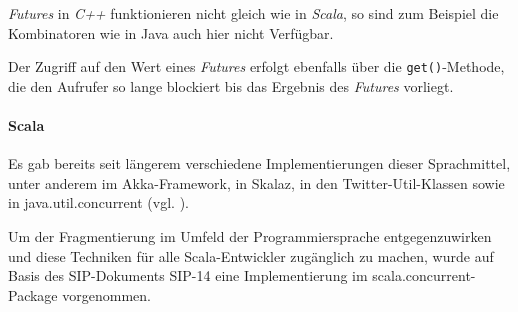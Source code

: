 \emph{Futures} in \emph{C++} funktionieren nicht gleich wie in
\emph{Scala}, so sind zum Beispiel die Kombinatoren wie in Java auch 
hier nicht Verfügbar.

Der Zugriff auf den Wert eines \emph{Futures} erfolgt ebenfalls über die
\texttt{get()}-Methode, die den Aufrufer so lange blockiert bis
das Ergebnis des \emph{Futures} vorliegt.

\paragraph{Scala} Es gab bereits seit längerem verschiedene 
Implementierungen dieser Sprachmittel,
unter anderem im Akka-Framework, in Skalaz, in den Twitter-Util-Klassen sowie
in java.util.concurrent (vgl. \cite{futuresTry}).

Um der Fragmentierung im Umfeld der Programmiersprache entgegenzuwirken und
diese Techniken für alle Scala-Entwickler zugänglich zu machen, wurde auf Basis
des SIP-Dokuments SIP-14 eine Implementierung im scala.concurrent-Package
vorgenommen.

